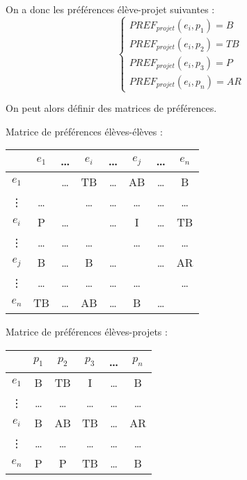 \documentclass[10pt,a4paper]{scrartcl}
\begin{document}
\begin{table}[h!]
\begin{minipage}[h]{.4\linewidth}
		\vspace{0.2cm}
		On a donc les préférences élève-projet suivantes : \\
		$$ 
		\left\{
			\begin{array}{ll}
				PREF_{projet}(e_{i}, p_{1}) = B \\
				PREF_{projet}(e_{i}, p_{2}) = TB \\
				PREF_{projet}(e_{i}, p_{3}) = P \\
				PREF_{projet}(e_{i}, p_{n}) = AR
			\end{array}
		\right.
		$$
	\end{minipage}
\end{table}

\vspace{0.5cm}
On peut alors définir des matrices de préférences.

\vspace{0.2cm}
Matrice de préférences élèves-élèves : \\
\begin{tabular}[h]{|*{8}{c|}}
	\hline
	  & $e_{1}$ & \ldots & $e_{i}$ & \ldots & $e_{j}$ & \ldots & $e_{n}$ \\
	\hline
	$e_{1}$  & \cellcolor{gray} & \ldots & TB & \ldots & AB & \ldots & B \\
	\hline
	\vdots  & \ldots  & \cellcolor{gray} & \ldots & \ldots & \ldots & \ldots & \ldots \\
	\hline
	$e_{i}$  & P & \ldots & \cellcolor{gray} & \ldots & I & \ldots & TB \\
	\hline
	\vdots  & \ldots  & \ldots & \ldots & \cellcolor{gray} & \ldots & \ldots & \ldots \\
	\hline
	$e_{j}$  & B & \ldots & B & \ldots & \cellcolor{gray} & \ldots & AR \\
	\hline
	\vdots  & \ldots  & \ldots & \ldots & \ldots & \ldots & \cellcolor{gray} & \ldots \\
	\hline
	$e_{n}$  & TB & \ldots & AB & \ldots & B & \ldots & \cellcolor{gray} \\
	\hline
\end{tabular}

\vspace{0.5cm}
Matrice de préférences élèves-projets :\\
\begin{tabular}{|*{6}{c|}}
	\hline
	  & $p_{1}$  & $p_{2}$  & $p_{3}$  & \ldots & $p_{n}$ \\
	\hline
	$e_{1}$  & B & TB & I & \ldots & B \\
	\hline
	\vdots  & \ldots  & \ldots & \ldots & \ldots & \ldots \\
	\hline
	$e_{i}$  & B & AB & TB & \ldots & AR \\
	\hline
	\vdots  & \ldots  & \ldots & \ldots & \ldots & \ldots \\
	\hline
	$e_{n}$  & P & P & TB & \ldots & B \\
	\hline
\end{tabular}
\end{document}
